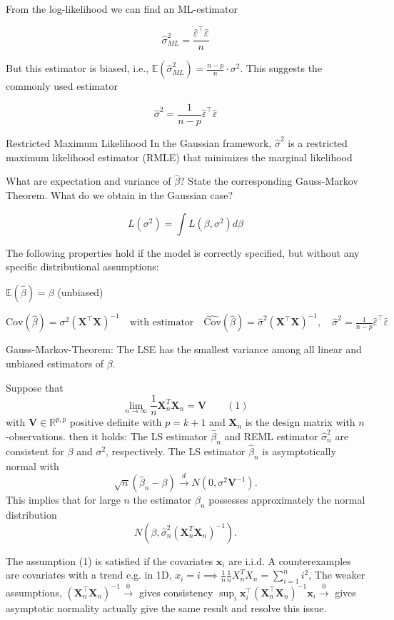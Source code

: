 From the log-likelihood we can find an ML-estimator

\[
\hat{\sigma}^2_{ML} = \frac{\hat{\varepsilon}^\top \hat{\varepsilon}}{n}
\]

But this estimator is biased, i.e., \(\mathbb{E}(\hat{\sigma}^2_{ML}) = \frac{n-p}{n} \cdot \sigma^2\).
This suggests the commonly used estimator

\[
\hat{\sigma}^2 = \frac{1}{n-p} \hat{\varepsilon}^\top \hat{\varepsilon}
\]

Restricted Maximum Likelihood
In the Gaussian framework, \(\hat{\sigma}^2\) is a restricted maximum likelihood estimator (RMLE) that minimizes the marginal likelihood


What are expectation and variance of \( \hat{β} \)? 
State the corresponding Gauss-Markov Theorem. What do we obtain in the Gaussian case?

\[
L(\sigma^2) = \int L(\beta, \sigma^2) d\beta
\]

The following properties hold if the model is correctly specified, but without any specific distributional assumptions:

\(\mathbb{E}(\hat{\beta}) = \beta\) (unbiased)

\(
\text{Cov}(\hat{\beta}) = \sigma^2 (\mathbf{X}^\top \mathbf{X})^{-1} \quad \text{with estimator} \quad \widehat{\text{Cov}}(\hat{\beta}) = \hat{\sigma}^2 (\mathbf{X}^\top \mathbf{X})^{-1}, \quad \hat{\sigma}^2 = \frac{1}{n-p} \hat{\varepsilon}^\top \hat{\varepsilon}
\)

Gauss-Markov-Theorem: The LSE has the smallest variance among all linear and unbiased estimators of \(\beta\).

Suppose that
\[
  \lim_{n \to \infty} \frac{1}{n} \mathbf{X}_n^T \mathbf{X}_n = \mathbf{V} \qquad (1)
\]
with \( \mathbf{V} \in \mathbb{R}^{p,p} \) positive definite with \( p = k + 1 \) and \( \mathbf{X}_n \) is the design matrix with
\( n \)-observations.
then it holds:
The LS estimator \( \hat{\beta}_n \) and REML estimator \( \hat{\sigma}^2_n \) are consistent for \( \beta \) and \( \sigma^2 \), respectively.
The LS estimator \( \hat{\beta}_n \) is asymptotically normal with
\[
\sqrt{n} (\hat{\beta}_n - \beta) \xrightarrow{d} N(0, \sigma^2 \mathbf{V}^{-1}).
\]
This implies that for large \( n \) the estimator \( \hat{\beta}_n \) possesses approximately the normal distribution
\[
  N\left( \beta, \hat{\sigma}^2_n (\mathbf{X}_n^T \mathbf{X}_n)^{-1} \right).
\]

The assumption (1) is satisfied if the covariates \(\mathbf{x}_i\) are i.i.d.
A counterexamples are covariates with a trend e.g. in 1D, \( x_i = i \implies \frac{1}{n}\frac{1}{n} X_n^T X_n = \sum_{i=1}^n i^2 \), 
The weaker assumptions,
\( (\mathbf{X}_n^\top\mathbf{X}_n)^{-1} \xrightarrow 0 \) gives consistency
\( \sup_i \mathbf{x}_i^\top(\mathbf{X}_n^\top\mathbf{X}_n)^{-1}\mathbf{x}_i \xrightarrow 0 \) gives asymptotic normality
actually give the same result and resolve this issue.

